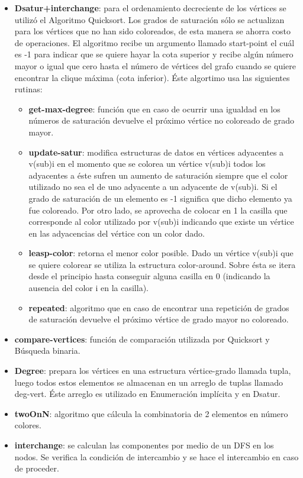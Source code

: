 \documentclass[a4paper,10pt]{article}
\begin{document}
\begin{itemize}
 \item \textbf{Dsatur+interchange}: para el ordenamiento decreciente de
       los vértices se utilizó el Algoritmo Quicksort. Los grados de
       saturación sólo se actualizan para los vértices que no han sido
       coloreados, de esta manera se ahorra costo de operaciones. El
       algoritmo recibe un argumento llamado start-point el cuál es -1
       para indicar que se quiere hayar la cota superior y recibe algún
       número mayor o igual que cero hasta el número de vértices del
       grafo cuando se quiere encontrar la clique máxima (cota
       inferior). \'Este algortimo usa las siguientes rutinas:
\begin{itemize}
 \item \textbf{get-max-degree}: función que en caso de ocurrir una
       igualdad en los números de saturación devuelve el próximo vértice
       no coloreado de grado mayor.
 \item \textbf{update-satur}: modifica estructuras de datos en vértices
       adyacentes a v(sub)i en el momento que se colorea un vértice
       v(sub)i todos los adyacentes a éste sufren un aumento de
       saturación siempre que el color utilizado no sea el de uno
       adyacente a un adyacente de v(sub)i. Si el grado de saturación de
       un elemento es -1 significa que dicho elemento ya fue
       coloreado. Por otro lado, se aprovecha de colocar en 1 la casilla
       que corresponde al color utilizado por v(sub)i indicando que 
       existe un vértice en las adyacencias del vértice con un color
       dado.
 \item \textbf{leasp-color}: retorna el menor color posible. Dado un
       vértice v(sub)i que se quiere colorear se utiliza la estructura
       color-around. Sobre ésta se itera desde el principio hasta
       conseguir alguna casilla en 0 (indicando la ausencia del color i
       en la casilla).
 \item \textbf{repeated}: algoritmo que en caso de encontrar una
       repetición de grados de saturación devuelve el próximo vértice de
       grado mayor no coloreado.
\end{itemize}
 \item \textbf{compare-vertices}: función de comparación utilizada por
       Quicksort y B\'usqueda binaria.
 \item \textbf{Degree}: prepara los vértices en una estructura
       vértice-grado llamada tupla, luego todos estos elementos se
       almacenan en un arreglo de tuplas llamado deg-vert. \'Este
       arreglo es utilizado en Enumeraci\'on impl\'icita y en Dsatur.
 \item \textbf{twoOnN}: algoritmo que cálcula la combinatoria de 2
       elementos en número colores.
 \item \textbf{interchange}: se calculan las componentes por medio de un
       DFS en los nodos. Se verifica la condición de intercambio y se
       hace el intercambio en caso de proceder.
\end{itemize}
\end{document}

